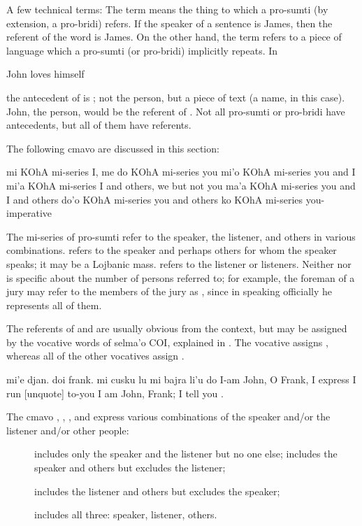 A few technical terms: The term  means the thing
    to which a pro-sumti (by extension, a pro-bridi) refers. If the
    speaker of a sentence is James, then the referent of the word
     is James. On the other hand, the term 
    refers to a piece of language which a pro-sumti (or pro-bridi)
    implicitly repeats. In
\begin{example}
John loves himself
\end{example}

{\noindent}the antecedent of  is ; not the person, but
    a piece of text (a name, in this case). John, the person, would
    be the referent of . Not all pro-sumti or pro-bridi
    have antecedents, but all of them have referents.



The following cmavo are discussed in this section:

   mi  KOhA    mi-series   I, me
    do  KOhA    mi-series   you
    mi'o    KOhA    mi-series   you and I
    mi'a    KOhA    mi-series   I and others,
                    we but not you
    ma'a    KOhA    mi-series   you and I and others
    do'o    KOhA    mi-series   you and others
    ko  KOhA    mi-series   you-imperative

The mi-series of pro-sumti refer to the speaker, the listener,
    and others in various combinations.  refers to the
    speaker and perhaps others for whom the speaker speaks; it may
    be a Lojbanic mass.  refers to the listener or listeners.
    Neither  nor  is specific about the number of
    persons referred to; for example, the foreman of a jury may
    refer to the members of the jury as , since in speaking
    officially he represents all of them. 

The referents of  and  are usually obvious from
    the context, but may be assigned by the vocative words of
    selma'o COI, explained in .
    The vocative  assigns , whereas all of the other
    vocatives assign .
\begin{example}
mi'e djan. doi frank.\n
\T	mi cusku lu mi bajra li'u do\n
I-am John, O Frank,\n
\T	I express  I run [unquote] to-you\n
I am John, Frank; I tell you .
\end{example}

The cmavo , , , and  express
    various combinations of the speaker and/or the listener and/or
    other people: 
\begin{description}
\item[]  includes only the speaker and the listener but no one else;  includes the speaker and others but excludes the listener;
\item[]  includes the listener and others but excludes the speaker;
\item[]  includes all three: speaker, listener, others.
\end{description}

